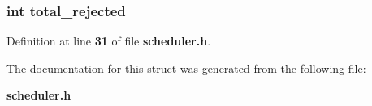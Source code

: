 \subsubsection[{total\+\_\+rejected}]{\setlength{\rightskip}{0pt plus 5cm}int total\+\_\+rejected}\label{struct_summary_a9e2beb39edf1a393dd256c89abdf4a14}


Definition at line {\bf 31} of file {\bf scheduler.\+h}.



The documentation for this struct was generated from the following file\+:\begin{DoxyCompactItemize}
\item 
{\bf scheduler.\+h}\end{DoxyCompactItemize}
